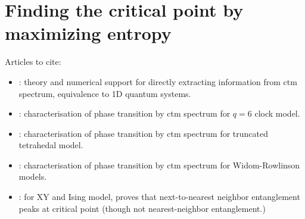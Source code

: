 \section{Finding the critical point by maximizing entropy}

Articles to cite:

\begin{itemize}
  \item \cite{huang2017holographic}: theory and numerical support for directly extracting information from ctm spectrum,
  equivalence to 1D quantum systems.
  \item \cite{krvcmar2016phase}: characterisation of phase transition by ctm spectrum for $q = 6$ clock model.
  \item \cite{PhysRevE.94.022134}: characterisation of phase transition by ctm spectrum for truncated tetrahedal model.
  \item \cite{krvcmar2015reentrant}: characterisation of phase transition by ctm spectrum for Widom-Rowlinson models.
  \item \cite{osborne2002entanglement}: for XY and Ising model, proves that next-to-nearest neighbor entanglement peaks
  at critical point (though not nearest-neighbor entanglement.)


\end{itemize}

